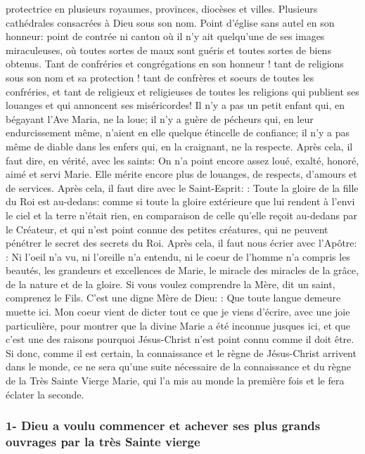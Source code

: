 protectrice en plusieurs royaumes, provinces, diocèses et villes. Plusieurs cathédrales consacrées à Dieu sous son
nom. Point d'église sans autel en son honneur: point de contrée ni canton où il n'y ait quelqu'une de ses images
miraculeuses, où toutes sortes de maux sont guéris et toutes sortes de biens obtenus. Tant de confréries et
congrégations en son honneur ! tant de religions sous son nom et sa protection ! tant de confrères et soeurs de
toutes les confréries, et tant de religieux et religieuses de toutes les religions qui publient ses louanges et qui
annoncent ses miséricordes! Il n'y a pas un petit enfant qui, en bégayant l'Ave Maria, ne la loue; il n'y a guère de
pécheurs qui, en leur endurcissement même, n'aient en elle quelque étincelle de confiance; il n'y a pas même de
diable dans les enfers qui, en la craignant, ne la respecte.
 Après cela, il faut dire, en vérité, avec les saints:
On n'a point encore assez loué, exalté, honoré, aimé et servi Marie. Elle mérite encore plus de louanges, de
respects, d'amours et de services.
 Après cela, il faut dire avec le Saint-Esprit: : Toute la gloire de la fille du
Roi est au-dedans: comme si toute la gloire extérieure que lui rendent à l'envi le ciel et la terre n'était rien, en
comparaison de celle qu'elle reçoit au-dedans par le Créateur, et qui n'est point connue des petites créatures, qui
ne peuvent pénétrer le secret des secrets du Roi.
 Après cela, il faut nous écrier avec l'Apôtre: : Ni
l'oeil n'a vu, ni l'oreille n'a entendu, ni le coeur de l'homme n'a compris les beautés, les grandeurs et excellences
de Marie, le miracle des miracles de la grâce, de la nature et de la gloire. Si vous voulez comprendre la Mère, dit
un saint, comprenez le Fils. C'est une digne Mère de Dieu: : Que toute langue demeure
muette ici.
 Mon coeur vient de dicter tout ce que je viens d'écrire, avec une joie particulière, pour montrer que la divine
Marie a été inconnue jusques ici, et que c'est une des raisons pourquoi Jésus-Christ n'est point connu comme il
doit être. Si donc, comme il est certain, la connaissance et le règne de Jésus-Christ arrivent dans le monde, ce ne
sera qu'une suite nécessaire de la connaissance et du règne de la Très Sainte Vierge Marie, qui l'a mis au monde
la première fois et le fera éclater la seconde.

\subsubsection{1- Dieu a voulu commencer et achever ses plus grands ouvrages par la très Sainte vierge}

